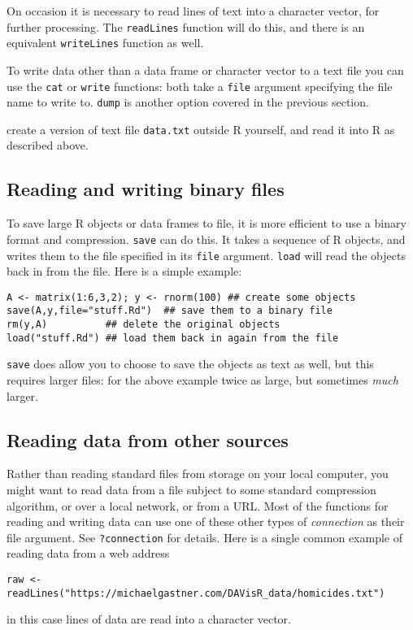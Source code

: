 \documentclass[10pt] {article}
\theoremstyle{definition}
\begin{document}
On occasion it is necessary to read lines of text into a character vector, for further processing. The {\tt readLines} function will do this, and there is an equivalent {\tt writeLines} function as well.

To write data other than a data frame or character vector to a text file you can use the {\tt cat} or {\tt write} functions: both take a {\tt file} argument specifying the file name to write to. {\tt dump} is another option covered in the previous section.

 create a version of text file {\tt data.txt} outside R yourself, and read it into R as described above.

\subsection{Reading and writing binary files}

To save large R objects or data frames to file, it is more efficient to use a binary format and compression. {\tt save} can do this. It takes a sequence of R objects, and writes them to the file specified in its {\tt file} argument. {\tt  load} will read the objects back in from the file. Here is a simple example:
\begin{lstlisting}
A <- matrix(1:6,3,2); y <- rnorm(100) ## create some objects
save(A,y,file="stuff.Rd")  ## save them to a binary file
rm(y,A)          ## delete the original objects
load("stuff.Rd") ## load them back in again from the file
\end{lstlisting}
{\tt save} does allow you to choose to save the objects as text as well, but this requires larger files: for the above example twice as large, but sometimes {\em much} larger.

\subsection{Reading data from other sources}

Rather than reading standard files from storage on your local computer, you might want to read data from a file subject to some standard compression algorithm, or over a local network, or from a URL. Most of the functions for reading and writing data can use one of these other types of {\em connection} as their file argument. See {\tt ?connection} for details. Here is a single common example of reading data from a web address
\begin{lstlisting}
raw <- readLines("https://michaelgastner.com/DAVisR_data/homicides.txt") 
\end{lstlisting}
in this case lines of data are read into a character vector.  
\end{document}
